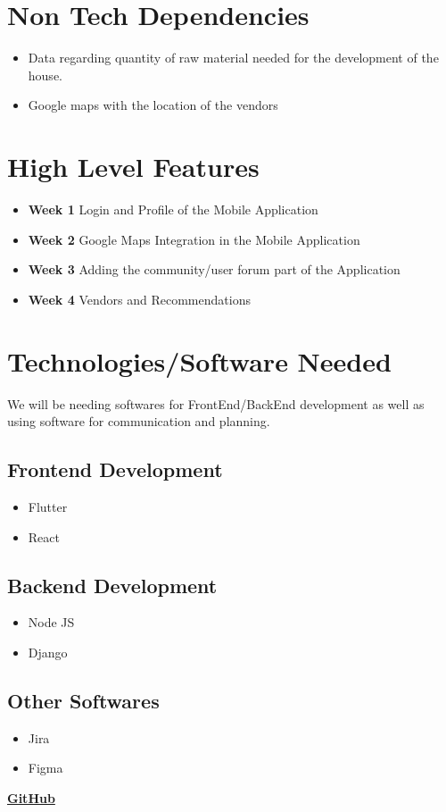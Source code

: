 \documentclass{article}
\begin{document}
\section{Non Tech Dependencies}
\begin{itemize}
    \item Data regarding quantity of raw material needed for the development of the
          house.
    \item Google maps with the location of the vendors
\end{itemize}

\section{High Level Features}
\begin{itemize}
    \item \textbf{Week 1} Login and Profile of the Mobile Application
    \item \textbf{Week 2} Google Maps Integration in the Mobile Application
    \item \textbf{Week 3} Adding the community/user forum part of the Application
    \item \textbf{Week 4} Vendors and Recommendations
\end{itemize}

\section{Technologies/Software Needed}
We will be needing softwares for FrontEnd/BackEnd development as well as using
software for communication and planning.
\subsection{Frontend Development}
\begin{itemize}
    \item Flutter
    \item React
\end{itemize}
\subsection{Backend Development}
\begin{itemize}
    \item Node JS
    \item Django
\end{itemize}
\subsection{Other Softwares}
\begin{itemize}
    \item Jira
    \item Figma
\end{itemize}

\href{github.com/aliasgharchakera/SE-Spring23-Project}{\textbf{GitHub}}
\end{document}
